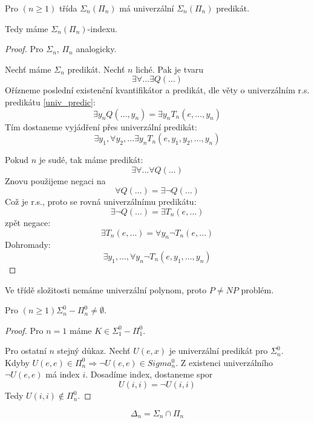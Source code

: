 \begin{theorem}\label{aritm_numer}
	Pro $(n \geq 1)$ třída $\Sigma_n(\Pi_n)$ má univerzální $\Sigma_n(\Pi_n)$ predikát.

	Tedy máme $\Sigma_n(\Pi_n)$-indexu.
\end{theorem}
\begin{proof}
	Pro $\Sigma_n$, $\Pi_n$ analogicky.

	Nechť máme $\Sigma_n$ predikát.
	Nechť $n$ liché. Pak je tvaru
	\[ \exists \forall \ldots \exists Q(\ldots) \]
	Ořízneme poslední existenční kvantifikátor a predikát, dle věty o univerzálním r.s. predikátu \cref{univ_predic}:
	\[ \exists y_n Q(\ldots, y_n) = \exists y_n T_n(e, \ldots, y_n) \]
	Tím dostaneme vyjádření přes univerzální predikát:
	\[ \exists y_1, \forall y_2, \ldots \exists y_n T_n(e, y_1, y_2, \ldots, y_n) \]

	Pokud $n$ je sudé, tak máme predikát:
	\[ \exists \forall \ldots \forall Q(\ldots) \]
	Znovu použijeme negaci na
	\[ \forall Q(\ldots) = \exists \neg Q(\ldots) \]
	Což je r.s., proto se rovná univerzálnímu predikátu:
	\[ \exists \neg Q(\ldots) = \exists T_n(e, \ldots) \]
	zpět negace:
	\[ \exists T_n(e, \ldots) = \forall y_n \neg T_n(e, \ldots) \]
	Dohromady:
	\[ \exists y_1, \ldots, \forall y_n \neg T_n(e, y_1, \ldots, y_n) \]
\end{proof}

\begin{note}
	Ve třídě složitosti nemáme univerzální polynom, proto $P \neq NP$ problém.
\end{note}

\begin{consequence}
	Pro $(n \geq 1) \Sigma_n^0 - \Pi_n^0 \neq \emptyset$.
\end{consequence}
\begin{proof}
	Pro $n = 1$ máme $K \in \Sigma_1^0 - \Pi_1^0$.

	Pro ostatní $n$ stejný důkaz.
	Nechť $U(e, x)$ je univerzální predikát pro $\Sigma_n^0$. Kdyby $U(e, e) \in \Pi_n^0 \Rightarrow \neg U(e, e) \in Sigma_n^0$.
	Z existenci univerzálního $\neg U(e, e)$ má index $i$.
	Dosadíme index, dostaneme spor
	\[ U(i, i) = \neg U(i, i) \]
	Tedy $U(i, i) \notin \Pi_n^0$.
\end{proof}

\begin{definition}[$\Delta_n$]
	\[ \Delta_n = \Sigma_n \cap \Pi_n \]
\end{definition}

